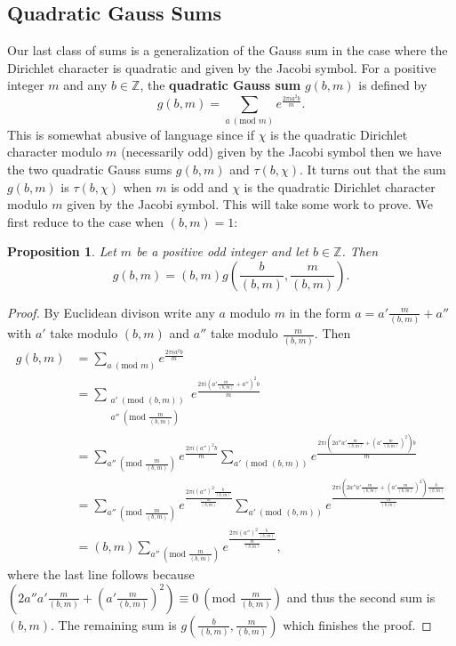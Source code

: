 \documentclass[12pt]{book}
\newtheorem{proposition}{Proposition}[section]
\theoremstyle{definition}\newframedtheorem{method}{Method}
\newcommand{\tmod}[1]{\ \left(\text{mod }#1\right)}
\newcommand{\Z}{\mathbb{Z}}
\newcommand{\<}{\langle}
\renewcommand{\>}{\rangle}
\begin{document}
    \subsection*{Quadratic Gauss Sums}
      Our last class of sums is a generalization of the Gauss sum in the case where the Dirichlet character is quadratic and given by the Jacobi symbol. For a positive integer $m$ and any $b \in \Z$, the \textbf{quadratic Gauss sum} $g(b,m)$ is defined by
      \[
        g(b,m) = \sum_{a \tmod{m}}e^{\frac{2\pi ia^{2}b}{m}}.
      \]
      This is somewhat abusive of language since if $\chi$ is the quadratic Dirichlet character modulo $m$ (necessarily odd) given by the Jacobi symbol then we have the two quadratic Gauss sums $g(b,m)$ and $\tau(b,\chi)$. It turns out that the sum $g(b,m)$ is $\tau(b,\chi)$ when $m$ is odd and $\chi$ is the quadratic Dirichlet character modulo $m$ given by the Jacobi symbol. This will take some work to prove. We first reduce to the case when $(b,m) = 1$:

      \begin{proposition}\label{prop:quadratic_Gauss_sum_relatively_prime_reduction}
        Let $m$ be a positive odd integer and let $b \in \Z$. Then
        \[
          g(b,m) = (b,m)g\left(\frac{b}{(b,m)},\frac{m}{(b,m)}\right).
        \]
      \end{proposition}
      \begin{proof}
        By Euclidean divison write any $a$ modulo $m$ in the form $a = a'\frac{m}{(b,m)}+a''$ with $a'$ take modulo $(b,m)$ and $a''$ take modulo $\frac{m}{(b,m)}$. Then
        \begin{align*}
          g(b,m) &= \sum_{a \tmod{m}}e^{\frac{2\pi ia^{2}b}{m}} \\
          &= \sum_{\substack{a' \tmod{(b,m)} \\ a'' \tmod{\frac{m}{(b,m)}}}}e^{\frac{2\pi i\left(a'\frac{m}{(b,m)}+a''\right)^{2}b}{m}} \\
          &= \sum_{a'' \tmod{\frac{m}{(b,m)}}}e^{\frac{2\pi i(a'')^{2}b}{m}}\sum_{a' \tmod{(b,m)}}e^{\frac{2\pi i\left(2a''a'\frac{m}{(b,m)}+\left(a'\frac{m}{(b,m)}\right)^{2}\right)b}{m}} \\
          &= \sum_{a'' \tmod{\frac{m}{(b,m)}}}e^{\frac{2\pi i(a'')^{2}\frac{b}{(b,m)}}{\frac{m}{(b,m)}}}\sum_{a' \tmod{(b,m)}}e^{\frac{2\pi i\left(2a''a'\frac{m}{(b,m)}+\left(a'\frac{m}{(b,m)}\right)^{2}\right)\frac{b}{(b,m)}}{\frac{m}{(b,m)}}} \\
          &= (b,m)\sum_{a'' \tmod{\frac{m}{(b,m)}}}e^{\frac{2\pi i(a'')^{2}\frac{b}{(b,m)}}{\frac{m}{(b,m)}}},
        \end{align*}
        where the last line follows because $\left(2a''a'\frac{m}{(b,m)}+\left(a'\frac{m}{(b,m)}\right)^{2}\right) \equiv 0 \tmod{\frac{m}{(b,m)}}$ and thus the second sum is $(b,m)$. The remaining sum is $g\left(\frac{b}{(b,m)},\frac{m}{(b,m)}\right)$ which finishes the proof.
      \end{proof}
\end{document}
